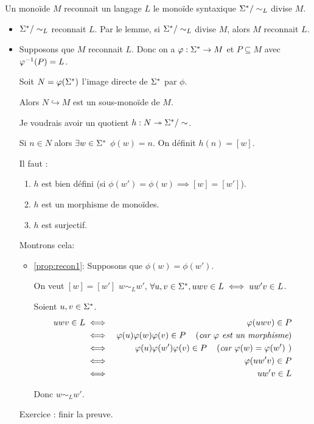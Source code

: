 \begin{prop}
	Un monoïde  $M$ reconnait  un langage $L$ \ssi le monoïde syntaxique $\Sigma^{*} / \sim_L$ divise $M$.
\end{prop}

\begin{proofI}
	\begin{itemize}
		\item \bimpRL

		      $\Sigma^{*} / \sim_L$ reconnait $L$. Par le lemme, si $\Sigma^{*} / \sim_L$ divise $M$, alors $M$ reconnait $L$.

		\item \bimpLR

		      Supposons que $M$ reconnait $L$. Donc on a $\varphi : \Sigma^{*} \to M$ et $P \subseteq M$ avec $\varphi^{-1} (P) = L$.

		      Soit $N = \varphi (\Sigma^{*})$ l'image directe de $\Sigma^{*}$ par $\phi$.

		      Alors $N \hookrightarrow M$ est un sous-monoïde de $M$.

		      Je voudrais avoir un quotient $h : N \twoheadrightarrow \Sigma^{*}/\sim$.

		      Si $n \in N$ alors $\exists w \in \Sigma^{*}$ \tq $\phi(w) = n$. On définit $h(n) = [w]$.

		      Il faut \mq :
		      \begin{enumerate}
			      \item $h$ est bien défini (si $\phi (w') = \phi (w) \implies [w] = [w']$). \label{prop:recon1}
			      \item $h$ est un morphisme de monoïdes.
			      \item $h$ est surjectif.
		      \end{enumerate}

		      Montrons cela:
		      \begin{itemize}
			      \item \ref{prop:recon1}: Supposons que $\phi(w) = \phi (w')$.

			            On veut \mq $[w]=[w']$ \cad $w \sim_L w'$, \cad $\forall u,v \in \Sigma^{*}, uwv \in L \iff uw'v \in L$.

			            Soient $u,v \in \Sigma^{*}$.
			            \begin{eqnarray*}
				            uwv \in L &\iff& \varphi (uwv) \in P\\
				            &\iff& \varphi (u)\varphi(w) \varphi(v) \in P \quad\left(\textit{car $\varphi$ est un morphisme}\right) \\
				            &\iff& \varphi (u)\varphi(w') \varphi(v) \in P \quad\left(\textit{car $\varphi (w) = \varphi (w')$ }\right) \\
				            &\iff& \varphi (uw'v) \in P\\
				            &\iff& uw'v \in L
			            \end{eqnarray*}

			            Donc $w \sim_L w'$.
		      \end{itemize}
		      Exercice : finir la preuve.
	\end{itemize}
\end{proofI}
